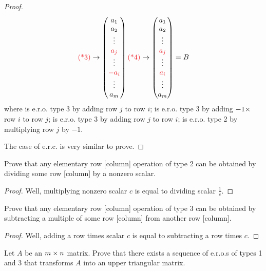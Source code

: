 \begin{proof}
\[    \text{\RED{(*3)}} \to \begin{pmatrix} a_1 \\ a_2 \\ \vdots \\ \RED{a_j} \\ \vdots \\ \RED{-a_i} \\ \vdots \\ a_m \end{pmatrix}
    \text{\RED{(*4)}} \to \begin{pmatrix} a_1 \\ a_2 \\ \vdots \\ \RED{a_j} \\ \vdots \\ \RED{a_i} \\ \vdots \\ a_m \end{pmatrix}
    = B
\]
where  is e.r.o. type 3 by adding row \(j\) to row \(i\);
 is e.r.o. type 3 by adding \(-1 \times\) row \(i\) to row \(j\);
 is e.r.o. type 3 by adding row \(j\) to row \(i\);
 is e.r.o. type 2 by multiplying row \(j\) by \(-1\).

The case of e.r.c. is very similar to prove.
\end{proof}

\begin{exercise} \label{exercise 3.1.10}
Prove that any elementary row [column] operation of type 2 can be obtained by dividing some row [column] by a nonzero scalar.
\end{exercise}

\begin{proof}
Well, multiplying nonzero scalar \(c\) is equal to dividing scalar \(\frac1{c}\).
\end{proof}

\begin{exercise} \label{exercise 3.1.11}
Prove that any elementary row [column] operation of type 3 can be obtained by subtracting a multiple of some row [column] from another row [column].
\end{exercise}

\begin{proof}
Well, adding a row times scalar \(c\) is equal to subtracting a row times \(c\).
\end{proof}

\begin{exercise} \label{exercise 3.1.12}
Let \(A\) be an \(m \times n\) matrix.
Prove that there exists a sequence of e.r.o.s of types 1 and 3 that transforms \(A\) into an upper triangular matrix.
\end{exercise}

